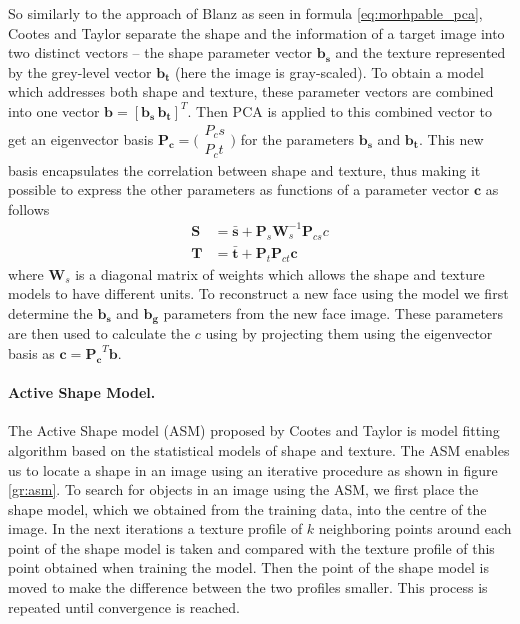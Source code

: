 \documentclass[11pt,a4paper]{report}
\begin{document}
So similarly to the approach of Blanz as seen in formula \ref{eq:morhpable_pca}, Cootes and Taylor separate the shape and the information of a target image into
two distinct vectors -- the shape parameter vector $\mathbf{b_s}$ and the texture
represented by the grey-level vector $\mathbf{b_t}$ (here the image is
gray-scaled). To obtain a model which addresses both shape and texture, these
parameter vectors are combined into one vector $\mathbf{b} = [\mathbf{b_s}\, \mathbf{b_t}]^T$. Then PCA is applied to this combined vector to get an
eigenvector basis $\mathbf{P_c} =
\bigl( \begin{smallmatrix}P_cs\\P_ct\end{smallmatrix} \bigr)$ for the parameters $\mathbf{b_s}$ and
$\mathbf{b_t}$. This new basis encapsulates the correlation between shape and
texture, thus making it possible to express the other
parameters as functions of a parameter vector $\mathbf{c}$ as follows
\begin{align} \label{gth:shape_mod} 
\mathbf{S} &= \mathbf{\bar{s}} + \mathbf{P}_s \mathbf{W}_s^{-1} \mathbf{P}_{cs}c\\
\label{gth:texture_mod}
\mathbf{T} &= \mathbf{\bar{t}} + \mathbf{P}_t \mathbf{P}_{ct} \mathbf{c}
\end{align}
where $\mathbf{W}_s$ is a diagonal matrix of weights which allows the shape and
texture models to have different units. To reconstruct a new face using the model we first determine the $\mathbf{b_s}$ and
$\mathbf{b_g}$ parameters from the new face image. These parameters are then
used to calculate the $c$ using by projecting them using the eigenvector basis
as $\mathbf{c} = \mathbf{P_c}^T\mathbf{b}$.

\paragraph{Active Shape Model.}
The Active Shape model (ASM) proposed by Cootes and Taylor is model fitting
algorithm based
on the statistical models of shape and texture. The ASM enables us to locate a
shape in an image using an iterative
procedure as shown in figure \ref{gr:asm}. To search for objects in an image
using the ASM, we first place the shape model, which we obtained from the training data, into
the centre of the image. In the next iterations a texture profile of $k$
neighboring points around each point of the shape model is taken and compared
with the texture profile of this point obtained when training the model. Then
the point of the shape model is moved to make the difference between the two
profiles smaller. This process is repeated until convergence is reached.
\end{document}
